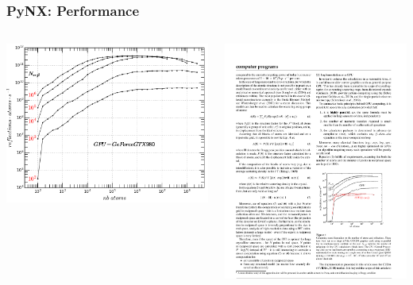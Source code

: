 \documentclass[]{beamer}
\begin{document}
\begin{frame}
\frametitle{PyNX: Performance }
    \begin{columns}
        \begin{column}{0.5\textwidth}
            \includegraphics[width=1.2\textwidth]{pics/GPU-GeForce_GTX_980-speed.png}
        \end{column}
        \hspace*{5mm}
        \begin{column}{0.5\textwidth}
            \includegraphics[width=1.08\textwidth]{pics/favre_pynx-test.pdf}

\end{column}
\end{columns}
\end{frame}
\end{document}
